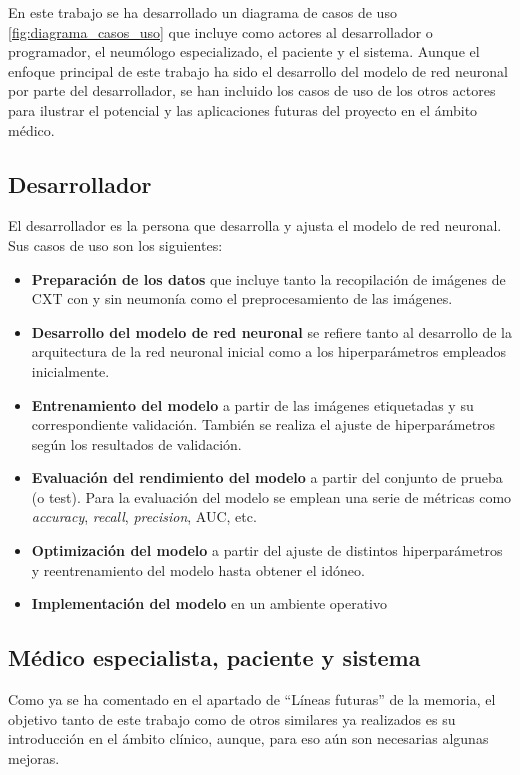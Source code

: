 En este trabajo se ha desarrollado un diagrama de casos de uso \ref{fig:diagrama_casos_uso} que incluye como actores al desarrollador o programador, el neumólogo especializado, el paciente y el sistema. Aunque el enfoque principal de este trabajo ha sido el desarrollo del modelo de red neuronal por parte del desarrollador, se han incluido los casos de uso de los otros actores para ilustrar el potencial y las aplicaciones futuras del proyecto en el ámbito médico.

\subsection{Desarrollador}
El desarrollador es la persona que desarrolla y ajusta el modelo de red neuronal. Sus casos de uso son los siguientes:
\begin{itemize}
    \item \textbf{Preparación de los datos} que incluye tanto la recopilación de imágenes de CXT con y sin neumonía como el preprocesamiento de las imágenes.
    \item \textbf{Desarrollo del modelo de red neuronal} se refiere tanto al desarrollo de la arquitectura de la red neuronal inicial como a los hiperparámetros empleados inicialmente.
    \item \textbf{Entrenamiento del modelo} a partir de las imágenes etiquetadas y su correspondiente validación. También se realiza el ajuste de hiperparámetros según los resultados de validación.
    \item \textbf{Evaluación del rendimiento del modelo} a partir del conjunto de prueba (o test). Para la evaluación del modelo se emplean una serie de métricas como \textit{accuracy}, \textit{recall}, \textit{precision}, AUC, etc.
    \item \textbf{Optimización del modelo} a partir del ajuste de distintos hiperparámetros y reentrenamiento del modelo hasta obtener el idóneo.
    \item \textbf{Implementación del modelo} en un ambiente operativo
\end{itemize}

\subsection{Médico especialista, paciente y sistema}
Como ya se ha comentado en el apartado de ``Líneas futuras'' de la memoria, el objetivo tanto de este trabajo como de otros similares ya realizados es su introducción en el ámbito clínico, aunque, para eso aún son necesarias algunas mejoras. 

